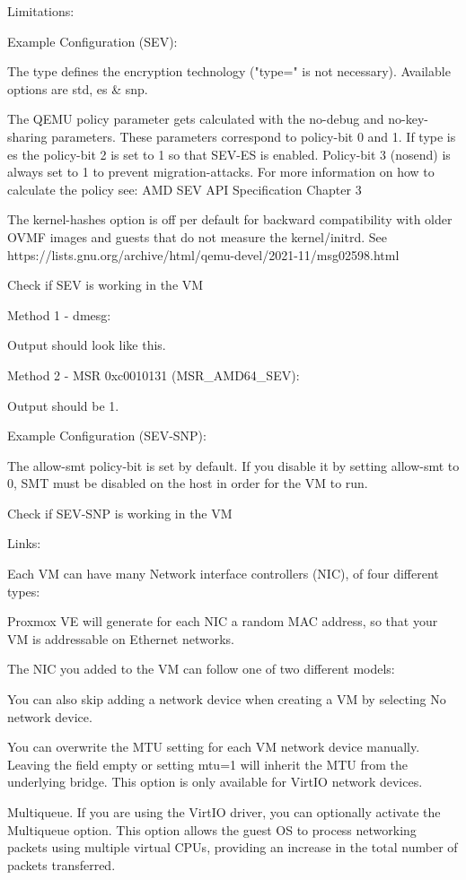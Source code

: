 Limitations:

Example Configuration (SEV):

The type defines the encryption technology ("type=" is not necessary). Available options are std, es & snp.

The QEMU policy parameter gets calculated with the no-debug and no-key-sharing parameters. These parameters correspond to policy-bit 0 and 1. If type is es the policy-bit 2 is set to 1 so that SEV-ES is enabled. Policy-bit 3 (nosend) is always set to 1 to prevent migration-attacks. For more information on how to calculate the policy see: AMD SEV API Specification Chapter 3

The kernel-hashes option is off per default for backward compatibility with older OVMF images and guests that do not measure the kernel/initrd. See https://lists.gnu.org/archive/html/qemu-devel/2021-11/msg02598.html

Check if SEV is working in the VM

Method 1 - dmesg:

Output should look like this.

Method 2 - MSR 0xc0010131 (MSR_AMD64_SEV):

Output should be 1.

Example Configuration (SEV-SNP):

The allow-smt policy-bit is set by default. If you disable it by setting allow-smt to 0, SMT must be disabled on the host in order for the VM to run.

Check if SEV-SNP is working in the VM

Links:

Each VM can have many Network interface controllers (NIC), of four different types:

Proxmox VE will generate for each NIC a random MAC address, so that your VM is addressable on Ethernet networks.

The NIC you added to the VM can follow one of two different models:

You can also skip adding a network device when creating a VM by selecting No network device.

You can overwrite the MTU setting for each VM network device manually. Leaving the field empty or setting mtu=1 will inherit the MTU from the underlying bridge. This option is only available for VirtIO network devices.

Multiqueue. If you are using the VirtIO driver, you can optionally activate the Multiqueue option. This option allows the guest OS to process networking packets using multiple virtual CPUs, providing an increase in the total number of packets transferred.


